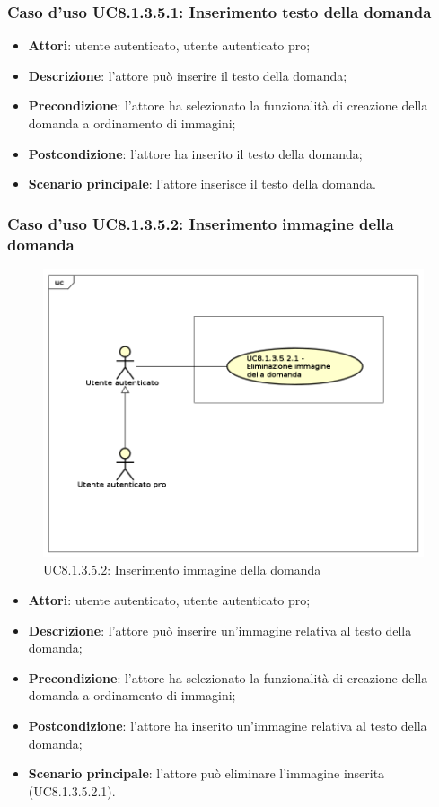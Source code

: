 \subsubsection{Caso d'uso UC8.1.3.5.1: Inserimento testo della domanda}
\begin{itemize}
	\item\textbf{Attori}: utente autenticato, utente autenticato pro;
	\item\textbf{Descrizione}: l'attore può inserire il testo della domanda;
	\item\textbf{Precondizione}: l'attore ha selezionato la funzionalità di creazione della domanda a ordinamento di immagini; 
	\item \textbf{Postcondizione}: l'attore ha inserito il testo della domanda;
	\item\textbf{Scenario principale}: l'attore inserisce il testo della domanda. 
\end{itemize}

\subsubsection{Caso d'uso UC8.1.3.5.2: Inserimento immagine della domanda}
\label{UC8.1.3.5.2}
\begin{figure}[h]
	\centering
	\includegraphics[scale=0.45,keepaspectratio]{UML/UC8_1_3_5_2.png}
	\caption{UC8.1.3.5.2: Inserimento immagine della domanda}
\end{figure}
\FloatBarrier
\begin{itemize}
	\item\textbf{Attori}: utente autenticato, utente autenticato pro;
	\item\textbf{Descrizione}: l'attore può inserire un'immagine relativa al testo della domanda;
	\item\textbf{Precondizione}: l'attore ha selezionato la funzionalità di creazione della domanda a ordinamento di immagini; 
	\item \textbf{Postcondizione}: l'attore ha inserito un'immagine relativa al testo della domanda;
	\item\textbf{Scenario principale}: l'attore può eliminare l'immagine inserita (UC8.1.3.5.2.1).
\end{itemize}

